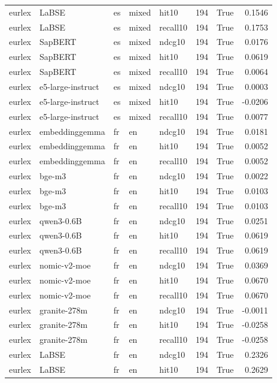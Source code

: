 \begin{tabular}{lllllrrr}
eurlex & LaBSE & es & mixed & hit10 & 194 & True & 0.1546 \\
eurlex & LaBSE & es & mixed & recall10 & 194 & True & 0.1753 \\
eurlex & SapBERT & es & mixed & ndcg10 & 194 & True & 0.0176 \\
eurlex & SapBERT & es & mixed & hit10 & 194 & True & 0.0619 \\
eurlex & SapBERT & es & mixed & recall10 & 194 & True & 0.0064 \\
eurlex & e5-large-instruct & es & mixed & ndcg10 & 194 & True & 0.0003 \\
eurlex & e5-large-instruct & es & mixed & hit10 & 194 & True & -0.0206 \\
eurlex & e5-large-instruct & es & mixed & recall10 & 194 & True & 0.0077 \\
eurlex & embeddinggemma & fr & en & ndcg10 & 194 & True & 0.0181 \\
eurlex & embeddinggemma & fr & en & hit10 & 194 & True & 0.0052 \\
eurlex & embeddinggemma & fr & en & recall10 & 194 & True & 0.0052 \\
eurlex & bge-m3 & fr & en & ndcg10 & 194 & True & 0.0022 \\
eurlex & bge-m3 & fr & en & hit10 & 194 & True & 0.0103 \\
eurlex & bge-m3 & fr & en & recall10 & 194 & True & 0.0103 \\
eurlex & qwen3-0.6B & fr & en & ndcg10 & 194 & True & 0.0251 \\
eurlex & qwen3-0.6B & fr & en & hit10 & 194 & True & 0.0619 \\
eurlex & qwen3-0.6B & fr & en & recall10 & 194 & True & 0.0619 \\
eurlex & nomic-v2-moe & fr & en & ndcg10 & 194 & True & 0.0369 \\
eurlex & nomic-v2-moe & fr & en & hit10 & 194 & True & 0.0670 \\
eurlex & nomic-v2-moe & fr & en & recall10 & 194 & True & 0.0670 \\
eurlex & granite-278m & fr & en & ndcg10 & 194 & True & -0.0011 \\
eurlex & granite-278m & fr & en & hit10 & 194 & True & -0.0258 \\
eurlex & granite-278m & fr & en & recall10 & 194 & True & -0.0258 \\
eurlex & LaBSE & fr & en & ndcg10 & 194 & True & 0.2326 \\
eurlex & LaBSE & fr & en & hit10 & 194 & True & 0.2629 \\

\end{tabular}
